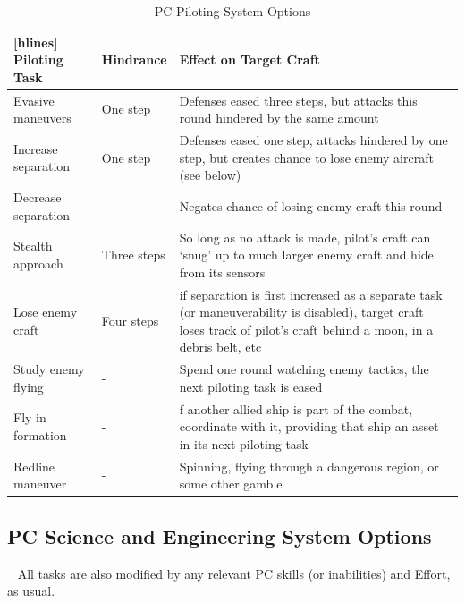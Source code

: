 \begin{table}[h]

\centering

\caption{PC Piloting System Options}
\label{tab:PC Piloting System Options}

\begin{NiceTabular}{ | Y | Y | Y[3] | }[hlines]
\hline
\textbf{Piloting Task} & \textbf{Hindrance}  & \textbf{Effect on Target Craft} \\ \hline
Evasive maneuvers & One step & Defenses eased three steps, but attacks this round hindered by the same amount \\ \hline
Increase separation & One step & Defenses eased one step, attacks hindered by one step, but creates chance to lose enemy aircraft (see below) \\ \hline
Decrease separation & - & Negates chance of losing enemy craft this round \\ \hline
Stealth approach & Three steps & So long as no attack is made, pilot’s craft can ‘snug’ up to much larger enemy craft and hide from its sensors \\ \hline
Lose enemy craft & Four steps & if separation is first increased as a separate task (or maneuverability is disabled), target craft loses track of pilot’s craft behind a moon, in a debris belt, etc \\ \hline
Study enemy flying & - & Spend one round watching enemy tactics, the next piloting task is eased \\ \hline
Fly in formation & - & f another allied ship is part of the combat, coordinate with it, providing that ship an asset in its next piloting task \\ \hline
Redline maneuver & - & Spinning, flying through a dangerous region, or some other gamble \\ \hline

\end{NiceTabular}
\end{table}

\begin{multicols}{2}

\subsection{PC Science and Engineering System Options}
	 
All tasks are also modified by any relevant PC skills (or inabilities) and Effort, as usual. 

\end{multicols}


